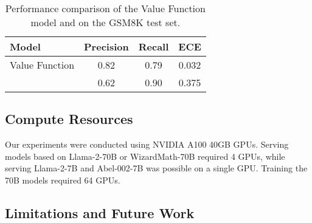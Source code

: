 \begin{table}[!htb]
    \centering
    \begin{tabular}{l|c|c|c}
        Model               & Precision & Recall & ECE \\
        \hline
        Value Function      & 0.82      & 0.79   & 0.032 \\
        \prm{}              & 0.62      & 0.90   & 0.375 \\
        \hline
    \end{tabular}
    \vspace{4mm}
    \caption{Performance comparison of the Value Function model and \prm{} on the GSM8K test set.}
    \label{table:ablation_critic}
\end{table}

\subsection{Compute Resources}
\label{app:compute_resources}
Our experiments were conducted using NVIDIA A100 40GB GPUs. Serving models based on Llama-2-70B or WizardMath-70B required 4 GPUs, while serving Llama-2-7B and Abel-002-7B was possible on a single GPU. Training the 70B models required 64 GPUs.
\subsection{Limitations and Future Work}
